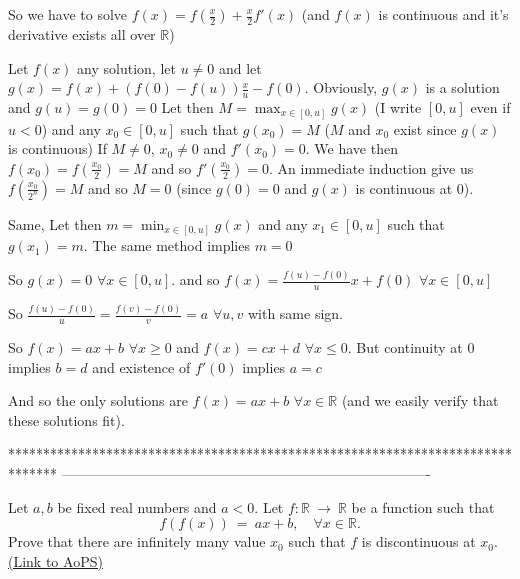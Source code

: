 \begin{solution}
	So we have to solve $ f(x) = f(\frac x2) + \frac x2f'(x)$ (and $ f(x)$ is continuous and it's derivative exists all over $ \mathbb R$)

Let $ f(x)$ any solution, let $ u\neq 0$ and let $ g(x) = f(x) + (f(0) - f(u))\frac xu - f(0)$. Obviously, $ g(x)$ is a solution and $ g(u) = g(0) = 0$
Let then $ M = \max_{x\in[0,u]}g(x)$ (I write $ [0,u]$ even if $ u < 0$) and any $ x_0\in[0,u]$ such that $ g(x_0) = M$ ($ M$ and $ x_0$ exist since $ g(x)$ is continuous)
If $ M\neq 0$, $ x_0\neq 0$ and $ f'(x_0) = 0$. We have then $ f(x_0) = f(\frac {x_0}{2}) = M$ and so $ f'(\frac {x_0}{2}) = 0$. 
An immediate induction give us $ f(\frac {x_0}{2^n}) = M$ and so $ M = 0$ (since $ g(0) = 0$ and $ g(x)$ is continuous at $ 0$).

Same, Let then $ m = \min_{x\in[0,u]}g(x)$ and any $ x_1\in[0,u]$ such that $ g(x_1) = m$. The same method implies $ m = 0$

So $ g(x) = 0$ $ \forall x\in[0,u]$. and so $ f(x) = \frac {f(u) - f(0)}{u}x + f(0)$ $ \forall x\in[0,u]$

So  $ \frac {f(u) - f(0)}{u} = \frac {f(v) - f(0)}{v}=a$ $ \forall u,v$ with same sign.

So $ f(x) = ax + b$ $ \forall x\geq 0$ and $ f(x) = cx + d$ $ \forall x\leq 0$. But continuity at $ 0$ implies $ b = d$ and existence of $ f'(0)$ implies $ a = c$

And so the only solutions are $ f(x) = ax + b$ $ \forall x\in\mathbb R$ (and we easily verify that these solutions fit).
\end{solution}
*******************************************************************************
-------------------------------------------------------------------------------

\begin{problem}
	Let $ a , b$ be fixed real numbers and $ a < 0$. Let $ f: \mathbb{R} \ \to \ \mathbb{R}$ be a function such that 
\[f(f(x)) \ = \ ax + b ,\quad  \forall   x \in \mathbb{R}.\]
Prove that there are infinitely many value $x_0$ such that $f$ is discontinuous at $x_0$.
	\flushright \href{https://artofproblemsolving.com/community/c6h286483}{(Link to AoPS)}
\end{problem}



